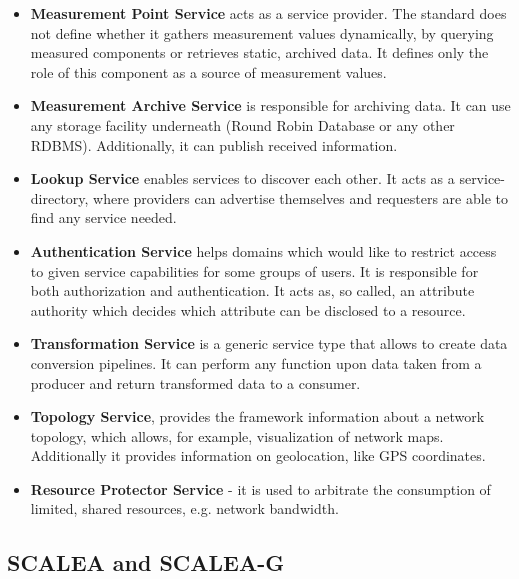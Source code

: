\begin{itemize}

\item{ {\bf Measurement Point Service} acts as a service provider. The standard does not define whether it gathers measurement values dynamically, by querying measured components or retrieves static, archived data. It defines only the role of this component as a source of measurement values.}

\item{ {\bf Measurement Archive Service} is responsible for archiving data. It can use any storage facility underneath (Round Robin Database or any other RDBMS). Additionally, it can publish received information. }

\item{ {\bf Lookup Service} enables services to discover each other. It acts as a service-directory, where providers can advertise themselves and requesters are able to find any service needed.}

\item{ {\bf Authentication Service} helps domains which would like to restrict access to given service capabilities for some groups of users. It is responsible for both authorization and authentication. It acts as, so called, an attribute authority which decides which attribute can be disclosed to a resource.}

\item{ {\bf Transformation Service} is a generic service type that allows to create data conversion pipelines. It can perform any function upon data taken from a producer and return transformed data to a consumer.}

\item{ {\bf Topology Service}, provides the framework information about a network topology, which allows, for example, visualization of network maps. Additionally it provides information on geolocation, like GPS coordinates.}

\item{ {\bf Resource Protector Service} - it is used to arbitrate the consumption of limited, shared resources, e.g. network bandwidth.} \end{itemize}


\subsection{SCALEA and SCALEA-G}


